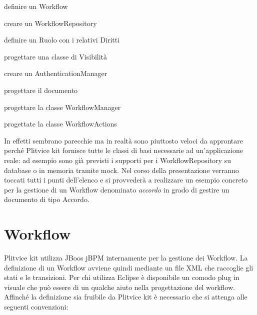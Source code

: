 \begin{itemize*}
\item definire un Workflow
\item creare un WorkflowRepository
\item definire un Ruolo con i relativi Diritti
\item progettare una classe di Visibilità
\item creare un AuthenticationManager
\item progettare il documento
\item progettare la classe WorkflowManager
\item progettate la classe WorkflowActions
\end{itemize*}

In effetti sembrano parecchie ma in realtà sono piuttosto veloci da approntare perché Plitvice kit fornisce tutte le classi di basi necessarie ad un'applicazione reale: ad esempio sono già previsti i supporti per i WorkflowRepository su database o in memoria tramite mock.
Nel corso della presentazione verranno toccati tutti i punti dell'elenco e si provvederà a realizzare un esempio concreto per la gestione di un Workflow denominato \textit{accordo} in grado di gestire un documento di tipo Accordo.

\section{Workflow}
Plitvice kit utilizza JBoos jBPM internamente per la gestione dei Workflow. La definizione di un Workflow avviene quindi mediante un file XML che raccoglie gli stati e le transizioni. Per chi utilizza Eclipse è disponibile un comodo plug in visuale che può essere di un qualche aiuto nella progettazione del workflow. Affinché la definizione sia fruibile da Plitvice kit è necessario che si attenga alle seguenti convenzioni:

